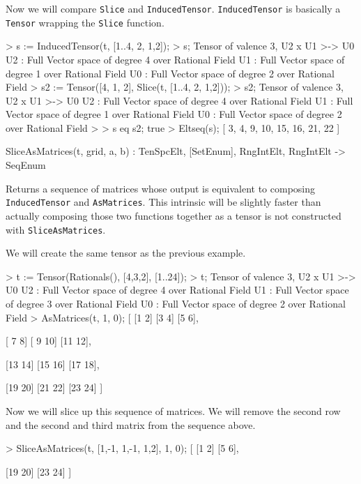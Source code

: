 \begin{example}[TensorSlicing]
Now we will compare \texttt{Slice} and \texttt{InducedTensor}. 
\texttt{InducedTensor} is basically a \texttt{Tensor} wrapping the \texttt{Slice} function.
\begin{code}
> s := InducedTensor(t, [{1..4}, {2}, {1,2}]);
> s;
Tensor of valence 3, U2 x U1 >-> U0
U2 : Full Vector space of degree 4 over Rational Field
U1 : Full Vector space of degree 1 over Rational Field
U0 : Full Vector space of degree 2 over Rational Field
> s2 := Tensor([4, 1, 2], Slice(t, [{1..4}, {2}, {1,2}]));
> s2;
Tensor of valence 3, U2 x U1 >-> U0
U2 : Full Vector space of degree 4 over Rational Field
U1 : Full Vector space of degree 1 over Rational Field
U0 : Full Vector space of degree 2 over Rational Field
> 
> s eq s2;
true
> Eltseq(s);
[ 3, 4, 9, 10, 15, 16, 21, 22 ]
\end{code}
\end{example}

\begin{intrinsics}
SliceAsMatrices(t, grid, a, b) : TenSpcElt, [SetEnum], RngIntElt, RngIntElt -> SeqEnum
\end{intrinsics}

Returns a sequence of matrices whose output is equivalent to composing
\texttt{InducedTensor} and \texttt{AsMatrices}. This intrinsic will be slightly
faster than actually composing those two functions together as a tensor is not
constructed with \texttt{SliceAsMatrices}.

\begin{example}[SliceAsMatrices]

We will create the same tensor as the previous example.
\begin{code}
> t := Tensor(Rationals(), [4,3,2], [1..24]);
> t;
Tensor of valence 3, U2 x U1 >-> U0
U2 : Full Vector space of degree 4 over Rational Field
U1 : Full Vector space of degree 3 over Rational Field
U0 : Full Vector space of degree 2 over Rational Field
> AsMatrices(t, 1, 0);
[
    [1 2]
    [3 4]
    [5 6],

    [ 7  8]
    [ 9 10]
    [11 12],

    [13 14]
    [15 16]
    [17 18],

    [19 20]
    [21 22]
    [23 24]
]
\end{code}

Now we will slice up this sequence of matrices. We will remove the second row
and the second and third matrix from the sequence above.
\begin{code}
> SliceAsMatrices(t, [{1,-1}, {1,-1}, {1,2}], 1, 0);
[
    [1 2]
    [5 6],

    [19 20]
    [23 24]
]
\end{code}
\end{example}

